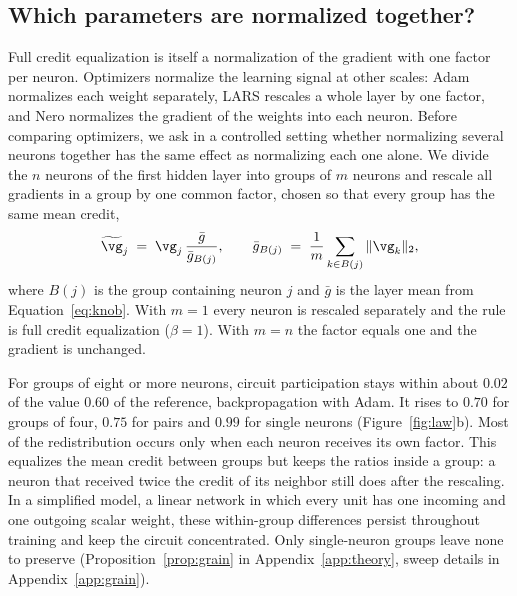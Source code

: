 \documentclass{article} %
\begin{document}
\subsection{Which parameters are normalized together?}
\label{sec:law}

Full credit equalization is itself a normalization of the gradient with one factor per neuron. Optimizers normalize the learning signal at other scales: Adam normalizes each weight separately, LARS rescales a whole layer by one factor, and Nero normalizes the gradient of the weights into each neuron. Before comparing optimizers, we ask in a controlled setting whether normalizing several neurons together has the same effect as normalizing each one alone. We divide the $n$ neurons of the first hidden layer into groups of $m$ neurons and rescale all gradients in a group by one common factor, chosen so that every group has the same mean credit,
\begin{equation}
\widetilde{\vg}_j \;=\; \vg_j\, \frac{\bar{g}}{\bar{g}_{B(j)}},
\qquad
\bar{g}_{B(j)} \;=\; \frac{1}{m}\sum_{k \in B(j)} \|\vg_k\|_2,
\label{eq:grain}
\end{equation}
where $B(j)$ is the group containing neuron $j$ and $\bar{g}$ is the layer mean from Equation~\ref{eq:knob}. With $m = 1$ every neuron is rescaled separately and the rule is full credit equalization ($\beta = 1$). With $m = n$ the factor equals one and the gradient is unchanged.

For groups of eight or more neurons, circuit participation stays within about $0.02$ of the value $0.60$ of the reference, backpropagation with Adam. It rises to $0.70$ for groups of four, $0.75$ for pairs and $0.99$ for single neurons (Figure~\ref{fig:law}b). Most of the redistribution occurs only when each neuron receives its own factor. This equalizes the mean credit between groups but keeps the ratios inside a group: a neuron that received twice the credit of its neighbor still does after the rescaling. In a simplified model, a linear network in which every unit has one incoming and one outgoing scalar weight, these within-group differences persist throughout training and keep the circuit concentrated. Only single-neuron groups leave none to preserve (Proposition~\ref{prop:grain} in Appendix~\ref{app:theory}, sweep details in Appendix~\ref{app:grain}).
\end{document}
